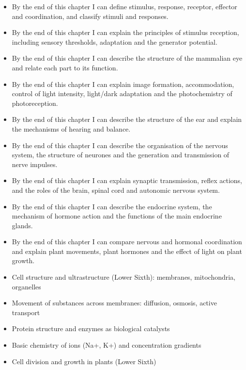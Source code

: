 \documentclass[11pt]{article}
\begin{document}
\begin{objectifs}
\begin{itemize}
\item By the end of this chapter I can define stimulus, response, receptor, effector and coordination, and classify stimuli and responses.
\item By the end of this chapter I can explain the principles of stimulus reception, including sensory thresholds, adaptation and the generator potential.
\item By the end of this chapter I can describe the structure of the mammalian eye and relate each part to its function.
\item By the end of this chapter I can explain image formation, accommodation, control of light intensity, light/dark adaptation and the photochemistry of photoreception.
\item By the end of this chapter I can describe the structure of the ear and explain the mechanisms of hearing and balance.
\item By the end of this chapter I can describe the organisation of the nervous system, the structure of neurones and the generation and transmission of nerve impulses.
\item By the end of this chapter I can explain synaptic transmission, reflex actions, and the roles of the brain, spinal cord and autonomic nervous system.
\item By the end of this chapter I can describe the endocrine system, the mechanism of hormone action and the functions of the main endocrine glands.
\item By the end of this chapter I can compare nervous and hormonal coordination and explain plant movements, plant hormones and the effect of light on plant growth.
\end{itemize}
\end{objectifs}

\begin{prerequis}
\begin{itemize}
\item Cell structure and ultrastructure (Lower Sixth): membranes, mitochondria, organelles
\item Movement of substances across membranes: diffusion, osmosis, active transport
\item Protein structure and enzymes as biological catalysts
\item Basic chemistry of ions (Na+, K+) and concentration gradients
\item Cell division and growth in plants (Lower Sixth)
\end{itemize}
\end{prerequis}
\end{document}
